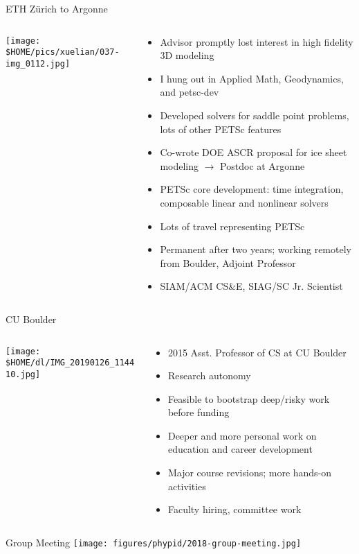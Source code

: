 \documentclass[aspectratio=1610]{beamer}
\begin{document}
\begin{frame}{ETH Z\"urich to Argonne}
  \begin{columns}
    \begin{column}{0.5\textwidth}
      \texttt{[image: \$HOME/pics/xuelian/037-img\_0112.jpg]}
    \end{column}
    \begin{column}{0.5\textwidth}
      \begin{itemize}
      \item Advisor promptly lost interest in high fidelity 3D
        modeling
      \item I hung out in Applied Math, Geodynamics, and petsc-dev
      \item Developed solvers for saddle point problems, lots of other
        PETSc features
      \item Co-wrote DOE ASCR proposal for ice sheet modeling
        $\to$ Postdoc at Argonne
      \item PETSc core development: time integration, composable
        linear and nonlinear solvers
      \item Lots of travel representing PETSc
      \item Permanent after two years; working remotely from Boulder,
        Adjoint Professor
      \item SIAM/ACM CS\&E, SIAG/SC Jr. Scientist
      \end{itemize}
    \end{column}
  \end{columns}
\end{frame}

\begin{frame}{CU Boulder}
  \begin{columns}
    \begin{column}{0.4\textwidth}
      \texttt{[image: \$HOME/dl/IMG\_20190126\_114410.jpg]}
    \end{column}
    \begin{column}{0.6\textwidth}
      \begin{itemize}
      \item 2015 Asst. Professor of CS at CU Boulder
      \item Research autonomy
      \item Feasible to bootstrap deep/risky work before funding
      \item Deeper and more personal work on education and career development
      \item Major course revisions; more hands-on activities
      \item Faculty hiring, committee work
      \end{itemize}
    \end{column}
  \end{columns}
\end{frame}

\begin{frame}{Group Meeting}
  \texttt{[image: figures/phypid/2018-group-meeting.jpg]}
\end{frame}
\end{document}
